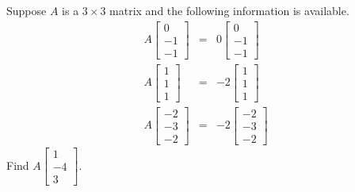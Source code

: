 \documentclass{ximera}
\begin{document}
\begin{problem}\label{prb:8.6} Suppose $A$ is a $3\times 3$ matrix and the following information is
available.
\begin{eqnarray*}
A\left[
\begin{array}{r}
0 \\
-1 \\
-1
\end{array}
\right] &=&0\left[
\begin{array}{r}
0 \\
-1 \\
-1
\end{array}
\right] \\
A\left[
\begin{array}{r}
1 \\
1 \\
1
\end{array}
\right] &=&-2\left[
\begin{array}{r}
1 \\
1 \\
1
\end{array}
\right] \\
A\left[
\begin{array}{r}
-2 \\
-3 \\
-2
\end{array}
\right] &=&-2\left[
\begin{array}{r}
-2 \\
-3 \\
-2
\end{array}
\right]
\end{eqnarray*}
Find $A\left[
\begin{array}{r}
1 \\
-4 \\
3
\end{array}
\right]. $
\end{problem}
\end{document}
